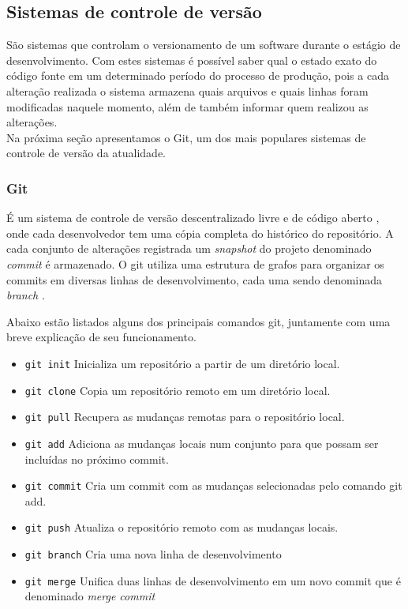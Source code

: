 \documentclass[a4paper,12pt]{article}
\begin{document}
\subsection{Sistemas de controle de versão}%
\label{sec:scv}
São sistemas que controlam o versionamento de um software durante o estágio de desenvolvimento. Com estes sistemas é possível saber qual o estado exato do código fonte em um determinado período do processo de produção, pois a cada alteração realizada o sistema armazena quais arquivos e quais linhas foram modificadas naquele momento, além de também informar quem realizou as alterações.\\

Na próxima seção apresentamos o Git, um dos mais populares sistemas de controle de versão da atualidade.

\subsubsection{Git}%
É um sistema de controle de versão descentralizado livre e de código aberto \cite{git}, onde cada desenvolvedor tem uma cópia completa do histórico do repositório. A cada conjunto de  alterações registrada  um \textit{snapshot} do projeto denominado \textit{commit} é armazenado. O git utiliza uma estrutura de grafos para organizar os commits em diversas linhas de desenvolvimento, cada uma sendo denominada \textit{branch} \cite{gitHandbook}.

Abaixo estão listados alguns dos principais comandos git, juntamente com uma breve explicação de seu funcionamento.

\begin{itemize}
\item{{\small\texttt{git init}} } Inicializa um repositório a partir de um diretório local.
\item{{\small\texttt{git clone}} } Copia um repositório remoto em um diretório local.
\item{{\small\texttt{git pull}} } Recupera as mudanças remotas para o repositório local.
\item{{\small\texttt{git add}} } Adiciona as mudanças locais num conjunto para que possam ser incluídas no próximo commit.
\item{{\small\texttt{git commit}} } Cria um commit com as mudanças selecionadas pelo comando git add.
\item{{\small\texttt{git push}} } Atualiza o repositório remoto com as mudanças locais.
\item{{\small\texttt{git branch}} } Cria uma nova linha de desenvolvimento
\item{{\small\texttt{git merge}} } Unifica duas linhas de desenvolvimento em um novo commit que é denominado \textit{merge commit}
\end{itemize}
\end{document}
